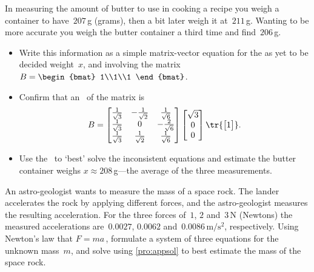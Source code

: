 \begin{exercise}  
In measuring the amount of butter to use in cooking a recipe you weigh a container to have~\(207\)\,g (grams), then a bit later weigh it at~\(211\)\,g.  
Wanting to be more accurate you weigh the butter container a third time and find~\(206\)\,g.
\begin{itemize}
\item Write this information as a simple matrix-vector equation for the as yet to be decided weight~\(x\), and involving the matrix \(B=\begin{bmat} 1\\1\\1 \end{bmat}\).
\item Confirm that an \svd\ of the matrix is
\begin{equation*}
B=\begin{bmatrix} \frac1{\sqrt3}&-\frac1{\sqrt2}&\frac1{\sqrt6}
\\\frac1{\sqrt3}&0&-\frac2{\sqrt6}
\\\frac1{\sqrt3}&\frac1{\sqrt2}&\frac1{\sqrt6}\end{bmatrix}
\begin{bmatrix} \sqrt3\\0\\0 \end{bmatrix}
\tr{\begin{bmatrix} 1 \end{bmatrix}}.
\end{equation*}
\item Use the \svd\ to `best' solve the inconsistent equations and estimate the butter container weighs \(x\approx 208\)\,g---the average of the three measurements.
\end{itemize}
\end{exercise}


\begin{comment}
Some of the following adapted from Chong, Ch.~12.
\end{comment}


\begin{exercise}  
An astro-geologist wants to measure the mass of a space rock.
The lander accelerates the rock by applying different forces, and the astro-geologist measures the resulting acceleration.
For the three forces of~\(1\), \(2\) and~\(3\)\,N (Newtons) the measured accelerations are~\(0.0027\), \(0.0062\) and~\(0.0086\,\text{m}/\text{s}^2\), respectively. 
Using Newton's law that \(F=ma\)\,, formulate a system of three equations for the unknown mass~\(m\), and solve using \autoref{pro:appsol} to best estimate the mass of the space rock.
\end{exercise}


